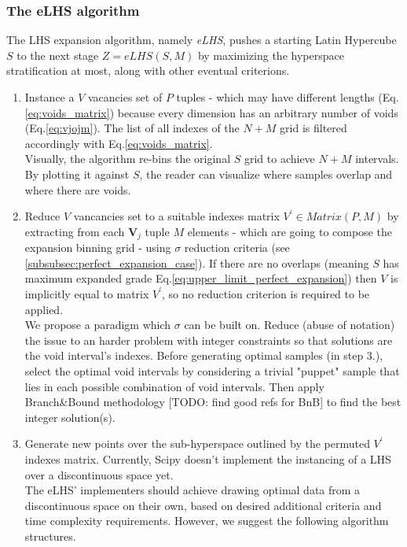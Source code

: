 \documentclass[12pt]{extarticle}
\newcommand{\meqref}[1]{Eq.\ref{#1}}
\begin{document}
\subsubsection{The eLHS algorithm}
\label{subsubsec:algorithm}
The LHS expansion algorithm, namely \textit{eLHS}, pushes a starting Latin Hypercube $S$ to the next stage $Z = eLHS(S, M)$ by maximizing the hyperspace stratification at most, along with other eventual criterions.

\begin{enumerate}
\item Instance a $V$ vacancies set of $P$ tuples - which may have different lengths (\meqref{eq:voids_matrix}) because every dimension has an arbitrary number of voids (\meqref{eq:vjojm}). The list of all indexes of the $N+M$ grid is filtered accordingly with \meqref{eq:voids_matrix}. \\ 
Visually, the algorithm re-bins the original $S$ grid to achieve $N+M$ intervals. By plotting it against $S$, the reader can visualize where samples overlap and where there are voids.

\item Reduce $V$ vancancies set to a suitable indexes matrix $V^\prime \in Matrix(P, M)$ by extracting from each $\textbf{V}_j$ tuple $M$ elements - which are going to compose the expansion binning grid - using $\sigma$ reduction criteria (see \cref{subsubsec:perfect_expansion_case}). If there are no overlaps (meaning $S$ has maximum expanded grade \meqref{eq:upper_limit_perfect_expansion}) then $V$ is implicitly equal to matrix $V^\prime$, so no reduction criterion is required to be applied. \\
We propose a paradigm which $\sigma$ can be built on. Reduce (abuse of notation) the issue to an harder problem with integer constraints so that solutions are the void interval's indexes. Before generating optimal samples (in step 3.), select the optimal void intervals by considering a trivial "puppet" sample that lies in each possible combination of void intervals. Then apply Branch{\&}Bound methodology [TODO: find good refs for BnB] to find the best integer solution(s).

\item Generate new points over the sub-hyperspace outlined by the permuted $V^\prime$ indexes matrix. Currently, Scipy doesn't implement the instancing of a LHS over a discontinuous space yet.\\
The eLHS' implementers should achieve drawing optimal data from a discontinuous space on their own, based on desired additional criteria and time complexity requirements. However, we suggest the following algorithm structures.
	

\end{enumerate}
\end{document}
